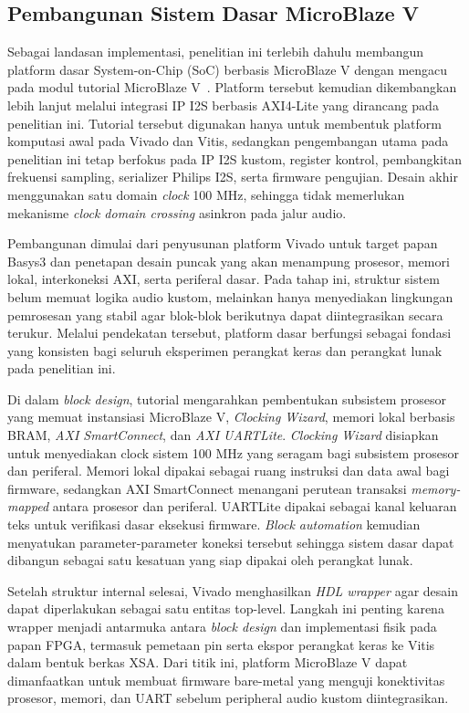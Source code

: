 \subsection{Pembangunan Sistem Dasar MicroBlaze V}

Sebagai landasan implementasi, penelitian ini terlebih dahulu membangun platform dasar System-on-Chip (SoC) berbasis MicroBlaze V dengan mengacu pada modul tutorial MicroBlaze V~\citep{bejo2025microblazev}. Platform tersebut kemudian dikembangkan lebih lanjut melalui integrasi IP I2S berbasis AXI4-Lite yang dirancang pada penelitian ini. Tutorial tersebut digunakan hanya untuk membentuk platform komputasi awal pada Vivado dan Vitis, sedangkan pengembangan utama pada penelitian ini tetap berfokus pada IP I2S kustom, register kontrol, pembangkitan frekuensi sampling, serializer Philips I2S, serta firmware pengujian. Desain akhir menggunakan satu domain \textit{clock} 100 MHz, sehingga tidak memerlukan mekanisme \textit{clock domain crossing} asinkron pada jalur audio.

Pembangunan dimulai dari penyusunan platform Vivado untuk target papan Basys3 dan penetapan desain puncak yang akan menampung prosesor, memori lokal, interkoneksi AXI, serta periferal dasar. Pada tahap ini, struktur sistem belum memuat logika audio kustom, melainkan hanya menyediakan lingkungan pemrosesan yang stabil agar blok-blok berikutnya dapat diintegrasikan secara terukur. Melalui pendekatan tersebut, platform dasar berfungsi sebagai fondasi yang konsisten bagi seluruh eksperimen perangkat keras dan perangkat lunak pada penelitian ini.

Di dalam \textit{block design}, tutorial mengarahkan pembentukan subsistem prosesor yang memuat instansiasi MicroBlaze V, \textit{Clocking Wizard}, memori lokal berbasis BRAM, \textit{AXI SmartConnect}, dan \textit{AXI UARTLite}. \textit{Clocking Wizard} disiapkan untuk menyediakan clock sistem 100 MHz yang seragam bagi subsistem prosesor dan periferal. Memori lokal dipakai sebagai ruang instruksi dan data awal bagi firmware, sedangkan AXI SmartConnect menangani perutean transaksi \textit{memory-mapped} antara prosesor dan periferal. UARTLite dipakai sebagai kanal keluaran teks untuk verifikasi dasar eksekusi firmware. \textit{Block automation} kemudian menyatukan parameter-parameter koneksi tersebut sehingga sistem dasar dapat dibangun sebagai satu kesatuan yang siap dipakai oleh perangkat lunak.

Setelah struktur internal selesai, Vivado menghasilkan \textit{HDL wrapper} agar desain dapat diperlakukan sebagai satu entitas top-level. Langkah ini penting karena wrapper menjadi antarmuka antara \textit{block design} dan implementasi fisik pada papan FPGA, termasuk pemetaan pin serta ekspor perangkat keras ke Vitis dalam bentuk berkas XSA. Dari titik ini, platform MicroBlaze V dapat dimanfaatkan untuk membuat firmware bare-metal yang menguji konektivitas prosesor, memori, dan UART sebelum peripheral audio kustom diintegrasikan.

